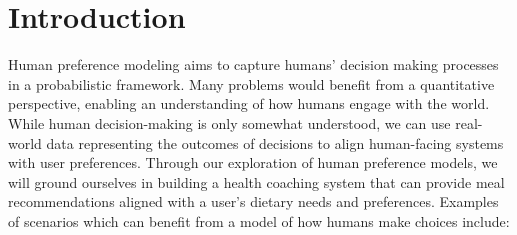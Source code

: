 \documentclass[
  letterpaper,
  DIV=11,
  numbers=noendperiod,
  oneside]{scrreprt}
\theoremstyle{remark}
\begin{document}
\section{Introduction}\label{introduction}

Human preference modeling aims to capture humans' decision making
processes in a probabilistic framework. Many problems would benefit from
a quantitative perspective, enabling an understanding of how humans
engage with the world. While human decision-making is only somewhat
understood, we can use real-world data representing the outcomes of
decisions to align human-facing systems with user preferences. Through
our exploration of human preference models, we will ground ourselves in
building a health coaching system that can provide meal recommendations
aligned with a user's dietary needs and preferences. Examples of
scenarios which can benefit from a model of how humans make choices
include:
\end{document}
